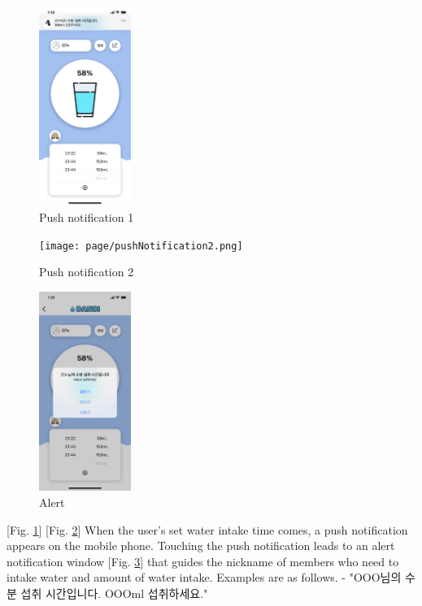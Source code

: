 \documentclass[conference]{IEEEtran}
\begin{document}
\begin{itemize}
\par \begin{figure}[h!]
\includegraphics[width=3cm]{page/pushNotification1.png}
\centering
\caption{Push notification 1}
\label{fig:notification1}
\end{figure}

\par \begin{figure}[h!]
\texttt{[image: page/pushNotification2.png]}
\centering
\caption{Push notification 2}
\label{fig:notification2}
\end{figure}

\par \begin{figure}[h!]
\includegraphics[width=3cm]{page/alert.png}
\centering
\caption{Alert}
\label{fig:alert}
\end{figure}

[Fig. \ref{fig:notification1}] [Fig. \ref{fig:notification2}] When the user's set water intake time comes, a push notification appears on the mobile phone. Touching the push notification leads to an alert notification window [Fig. \ref{fig:alert}] that guides the nickname of members who need to intake water and amount of water intake. Examples are as follows. - "OOO님의 수분 섭취 시간입니다. OOOml 섭취하세요."


\end{itemize}
\end{document}
